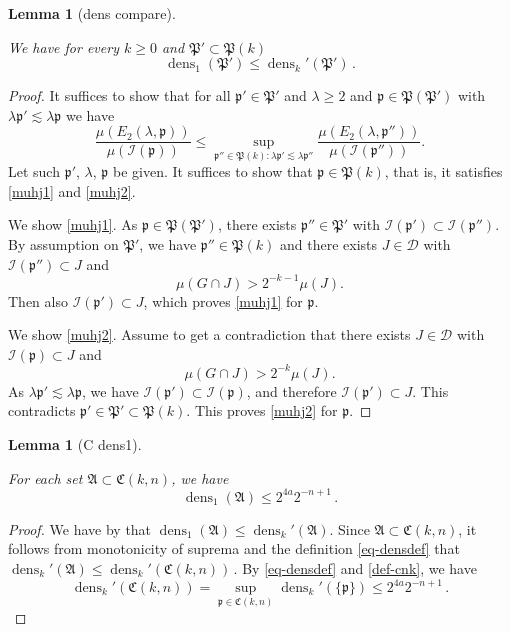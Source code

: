 \documentclass[10pt,a4paper]{article}
\theoremstyle{plain}
\newtheorem{lemma}[theorem]{Lemma}
\theoremstyle{definition}
\numberwithin{equation}{subsection}
\DeclareMathOperator{\dens}{\operatorname{dens}}
\newcommand{\fp}{{\mathfrak p}}
\newcommand{\fP}{{\mathfrak P}}
\newcommand{\fC}{{\mathfrak C}}
\newcommand{\scI}{{\mathcal{I}}} %
\newcommand{\lean}[1]{}
\newcommand{\uses}[1]{}
\newcommand{\leanok}{}
\begin{document}
\begin{lemma}[dens compare]
    \label{dens-compare}
    \leanok
    \lean{dens1_le_dens'}
    We have for every $k\ge 0$ and $\fP'\subset \fP(k)$
\begin{equation}
    \dens_1(\fP')\le \dens_k'(\fP')\, .
\end{equation}
\end{lemma}
\begin{proof}
\leanok
It suffices to show that for all $\fp'\in \fP'$
and $\lambda\ge 2$ and $\fp\in \fP(\fP')$ with $\lambda \fp' \lesssim \lambda \fp$ we have
\begin{equation}
    \frac{\mu({E}_2(\lambda, \fp))}{\mu(\scI(\fp))}
    \le \sup_{\fp'' \in \fP(k): \lambda \fp' \lesssim \lambda \fp''}
    \frac{\mu({E}_2(\lambda, \fp''))}{\mu(\scI(\fp''))}.
\end{equation}
    Let such $\fp'$, $\lambda$, $\fp$ be given.
    It suffices to show that $\fp\in \fP(k)$,
    that is, it satisfies \eqref{muhj1}
    and \eqref{muhj2}.

We show \eqref{muhj1}.
 As $\fp\in \fP(\fP')$, there exists
$\fp''\in \fP'$ with $\scI(\fp')\subset \scI(\fp'')$. By assumption on $\fP'$, we have $\fp''\in \fP(k)$ and there exists
$J\in \mathcal{D}$ with
   $\scI(\fp'')\subset J$ and
   \begin{equation}
       \mu(G\cap J)>2^{-k-1} \mu(J).
   \end{equation}
Then also $\scI(\fp')\subset J$, which proves
\eqref{muhj1} for $\fp$.

We show \eqref{muhj2}. Assume to get a contradiction that
there exists $J\in \mathcal{D}$ with
   $\scI(\fp)\subset J$ and
   \begin{equation}\label{mugj}
       \mu(G\cap J)>2^{-k} \mu(J).
   \end{equation}
   As $\lambda\fp'\lesssim \lambda\fp$, we have $\scI(\fp')\subset \scI(\fp)$, and therefore
    $\scI(\fp')\subset J$. This contradicts
   $\fp'\in \fP'\subset \fP(k)$. This proves
\eqref{muhj2} for $\fp$.
\end{proof}

\begin{lemma}[C dens1]
    \label{C-dens1}
    \leanok
    \lean{dens1_le}
    \uses{dens-compare}
    For each set $\mathfrak{A} \subset \mathfrak{C}(k,n)$, we have
    $$
        \dens_1(\mathfrak{A}) \le 2^{4a}2^{-n+1}\,.
    $$
\end{lemma}

\begin{proof}
    \leanok
    We have by  that
    $\dens_1(\mathfrak{A}) \le \dens_k'(\mathfrak{A})$. Since $\mathfrak{A} \subset \fC(k,n)$, it follows from monotonicity of suprema and the definition \eqref{eq-densdef} that
    $
        \dens_k'(\mathfrak{A}) \le \dens_k'(\fC(k,n))\,.
    $
    By \eqref{eq-densdef} and \eqref{def-cnk}, we have
    $$
        \dens_k'(\fC(k,n)) = \sup_{\fp \in \fC(k,n)} \dens_k'(\{\fp\}) \le 2^{4a}2^{-n+1}\,.
    $$
\end{proof}
\end{document}
